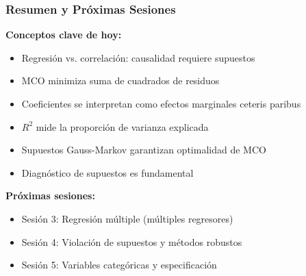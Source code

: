 \documentclass[aspectratio=169,11pt]{beamer}
\begin{document}
\begin{frame}
\frametitle{Resumen y Próximas Sesiones}

\small
\textbf{Conceptos clave de hoy:}
\setlength{\itemsep}{2pt}
\begin{itemize}
    \item Regresión vs. correlación: causalidad requiere supuestos
    \item MCO minimiza suma de cuadrados de residuos
    \item Coeficientes se interpretan como efectos marginales ceteris paribus
    \item $R^2$ mide la proporción de varianza explicada
    \item Supuestos Gauss-Markov garantizan optimalidad de MCO
    \item Diagnóstico de supuestos es fundamental
\end{itemize}

\vspace{0.5cm}
\textbf{Próximas sesiones:}
\begin{itemize}
    \item Sesión 3: Regresión múltiple (múltiples regresores)
    \item Sesión 4: Violación de supuestos y métodos robustos
    \item Sesión 5: Variables categóricas y especificación
\end{itemize}
\end{frame}

\end{document}

